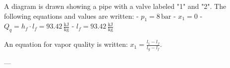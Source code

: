 A diagram is drawn showing a pipe with a valve labeled "1" and "2". The following equations and values are written:  
- \( p_{1} = 8 \, \text{bar} \)  
- \( x_{1} = 0 \)  
- \( Q_q = h_f \cdot l_f = 93.42 \, \frac{\text{kJ}}{\text{kg}} \)  
- \( l_f = 93.42 \, \frac{\text{kJ}}{\text{kg}} \)  

An equation for vapor quality is written:  
\( x_{1} = \frac{l_1 - l_f}{l_g - l_f} \).  

---